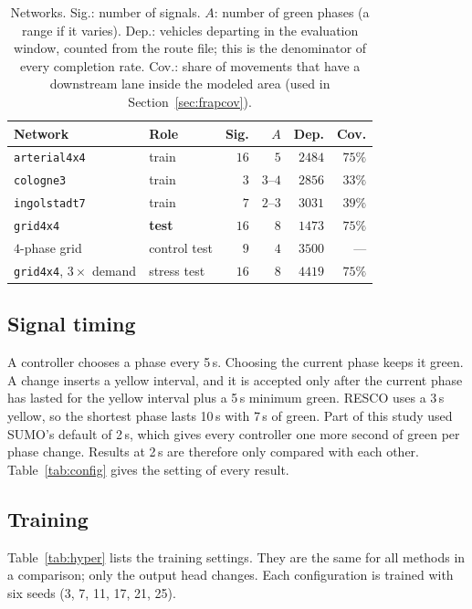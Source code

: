 \documentclass[conference]{IEEEtran}
\begin{document}
\begin{table}[ht]
\caption{Networks. \textnormal{Sig.}: number of signals. $A$: number of green phases
(a range if it varies). \textnormal{Dep.}: vehicles departing in the evaluation window,
counted from the route file; this is the denominator of every completion rate.
\textnormal{Cov.}: share of movements that have a downstream lane inside the modeled area
(used in Section~\ref{sec:frapcov}).}
\label{tab:networks}
\centering\scriptsize\setlength{\tabcolsep}{4pt}
\begin{tabular}{@{}llrrrr@{}}
\toprule
Network & Role & Sig. & $A$ & Dep. & Cov. \\
\midrule
\texttt{arterial4x4} & train & $16$ & $5$ & $2484$ & $75\%$ \\
\texttt{cologne3} & train & $3$ & $3$--$4$ & $2856$ & $33\%$ \\
\texttt{ingolstadt7} & train & $7$ & $2$--$3$ & $3031$ & $39\%$ \\
\texttt{grid4x4} & \textbf{test} & $16$ & $8$ & $1473$ & $75\%$ \\
\midrule
$4$-phase grid & control test & $9$ & $4$ & $3500$ & --- \\
\texttt{grid4x4}, $3\times$ demand & stress test & $16$ & $8$ & $4419$ & $75\%$ \\
\bottomrule
\end{tabular}
\end{table}

\subsection{Signal timing}\label{sec:timing}
A controller chooses a phase every 5\,s. Choosing the current phase keeps it green. A
change inserts a yellow interval, and it is accepted only after the current phase has
lasted for the yellow interval plus a 5\,s minimum green. RESCO uses a 3\,s yellow, so the
shortest phase lasts 10\,s with 7\,s of green. Part of this study used SUMO's default of
2\,s, which gives every controller one more second of green per phase change. Results at
2\,s are therefore only compared with each other. Table~\ref{tab:config} gives the setting
of every result.

\subsection{Training}
Table~\ref{tab:hyper} lists the training settings. They are the same for all methods in a
comparison; only the output head changes. Each configuration is trained with six seeds
(3, 7, 11, 17, 21, 25).
\end{document}
